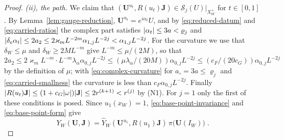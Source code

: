 \begin{proof}
\emph{(ii), the path.} We claim that $(\mathbf U^{u_t}, R(u_t)\mathbf J) \in \mathcal S_j(U)|_{X^+_W}$ for $t \in [0, 1]$. By Lemma~\ref{lem:gauge-reduction}, $\mathbf U^{u_t} = e^{i\alpha_t}U$, and by \eqref{eq:reduced-datum} and \eqref{eq:carried-ratios} the complex part satisfies $\lvert\alpha_t\rvert \leq 3a < \varrho_j$ and $\lvert\delta_e\alpha_t\rvert \leq 2a_2 \leq 2\varkappa_mL^{-2m}\alpha_{1,j}L^{-2j} < \alpha_{1,j}L^{-2j}$. For the curvature we use that $\delta_W \leq \mu$ and $\delta_W \geq 2ML^{-m}$ give $L^{-m} \leq \mu/(2M)$, so that $2a_2 \leq 2\varkappa_mL^{-m} \cdot L^{-m}\lambda_\alpha\alpha_{0,j}L^{-2j} \leq (\mu\lambda_\alpha/(20M))\alpha_{0,j}L^{-2j} \leq (c_F/(20c_G))\alpha_{0,j}L^{-2j}$ by the definition of $\mu$; with \eqref{eq:complex-curvature} for $a_\circ = 3a \leq \varrho_j$ and \eqref{eq:carried-smallness} the curvature is less than $c_F\alpha_{0,j}L^{-2j}$. Finally $\lvert R(u_t)\mathbf J\rvert \leq (1 + c_G\lvert\omega\rvert)\lvert\mathbf J\rvert \leq 2r^{(k+1)} < r^{(j)}$ by (N1). For $j = 1$ only the first of these conditions is posed. Since $u_1(x_W) = 1$, \eqref{eq:base-point-invariance} and \eqref{eq:base-point-form} give
\begin{equation}\label{eq:carried-identity}
    Y_W(\mathbf U, \mathbf J) = \hat Y_W(\mathbf U^{u_1}, R(u_1)\mathbf J)\,\pi\bigl(\mathbf U(I_W)\bigr)\;.
\end{equation}


\end{proof}
